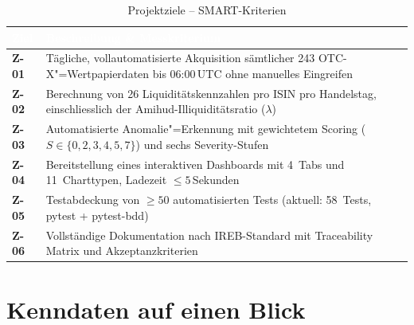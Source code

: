 \documentclass[11pt, a4paper, oneside, openany]{report}
\begin{document}
\begin{table}[H]
\centering
\caption{Projektziele -- SMART-Kriterien}
\label{tab:smart}
\sffamily\small
\begin{tabularx}{\textwidth}{>{\bfseries\sffamily\color{SwissRed}}l X}
  \toprule
  \rowcolor{DeepNavy} \textcolor{white}{\textbf{Ziel}} & \textcolor{white}{\textbf{Beschreibung \& Messkriterium}} \\
  \midrule
  Z-01 & Tägliche, vollautomatisierte Akquisition sämtlicher 243 OTC-X"=Wertpapierdaten bis 06:00\,UTC ohne manuelles Eingreifen \\
  Z-02 & Berechnung von 26 Liquiditätskennzahlen pro ISIN pro Handelstag, einschliesslich der Amihud-Illiquiditätsratio ($\lambda$) \\
  Z-03 & Automatisierte Anomalie"=Erkennung mit gewichtetem Scoring ($S \in \{0,2,3,4,5,7\}$) und sechs Severity-Stufen \\
  Z-04 & Bereitstellung eines interaktiven Dashboards mit 4~Tabs und 11~Charttypen, Ladezeit $\leq 5$\,Sekunden \\
  Z-05 & Testabdeckung von $\geq 50$ automatisierten Tests (aktuell: 58~Tests, pytest + pytest-bdd) \\
  Z-06 & Vollständige Dokumentation nach IREB-Standard mit Traceability Matrix und Akzeptanzkriterien \\
  \bottomrule
\end{tabularx}
\end{table}

\section{Kenndaten auf einen Blick}
\label{sec:kenndaten}
\end{document}
